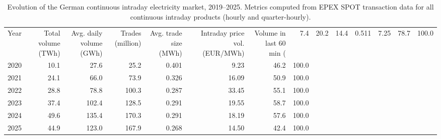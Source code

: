 \begin{table}[ht]
\centering
\caption{Evolution of the German continuous intraday electricity market, 2019--2025. Metrics computed from EPEX SPOT transaction data for all continuous intraday products (hourly and quarter-hourly).}
\label{tab:intraday_market_evolution}
\small
\begin{tabular}{lrrrrrrr}
\toprule
Year & Total volume (TWh) & Avg. daily volume (GWh) & Trades (million) & Avg. trade size (MWh) & Intraday price vol. (EUR/MWh) & Volume in last 60 min (%
 & 7.4 & 20.2 & 14.4 & 0.511 & 7.25 & 78.7 & 100.0 \\
2020 & 10.1 & 27.6 & 25.2 & 0.401 & 9.23 & 46.2 & 100.0 \\
2021 & 24.1 & 66.0 & 73.9 & 0.326 & 16.09 & 50.9 & 100.0 \\
2022 & 28.8 & 78.8 & 100.3 & 0.287 & 33.45 & 55.1 & 100.0 \\
2023 & 37.4 & 102.4 & 128.5 & 0.291 & 19.55 & 58.7 & 100.0 \\
2024 & 49.6 & 135.4 & 170.3 & 0.291 & 18.19 & 57.6 & 100.0 \\
2025 & 44.9 & 123.0 & 167.9 & 0.268 & 14.50 & 42.4 & 100.0 \\
\bottomrule
\end{tabular}
\end{table}
